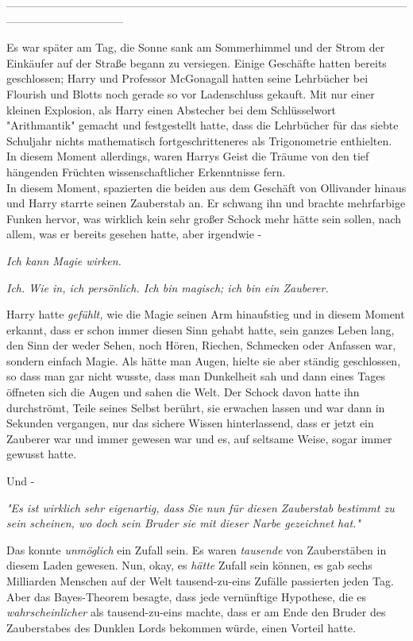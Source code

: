 {--------------------------------------------------------------------------------------------------------------------------------------------

Es war später am Tag, die Sonne sank am Sommerhimmel und der Strom der Einkäufer auf der Straße begann zu versiegen. Einige Geschäfte hatten bereits geschlossen; Harry und Professor McGonagall hatten seine Lehrbücher bei Flourish und Blotts noch gerade so vor Ladenschluss gekauft. Mit nur einer kleinen Explosion, als Harry einen Abstecher bei dem Schlüsselwort "Arithmantik" gemacht und festgestellt hatte, dass die Lehrbücher für das siebte Schuljahr nichts mathematisch fortgeschritteneres als Trigonometrie enthielten.\\ In diesem Moment allerdings, waren Harrys Geist die Träume von den tief hängenden Früchten wissenschaftlicher Erkenntnisse fern.\\ In diesem Moment, spazierten die beiden aus dem Geschäft von Ollivander hinaus und Harry starrte seinen Zauberstab an. Er schwang ihn und brachte mehrfarbige Funken hervor, was wirklich kein sehr großer Schock mehr hätte sein sollen, nach allem, was er bereits gesehen hatte, aber irgendwie -

\emph{Ich kann Magie wirken.}

\emph{Ich. Wie in, ich persönlich. Ich bin magisch; ich bin ein Zauberer.}

Harry hatte \emph{gefühlt,} wie die Magie seinen Arm hinaufstieg und in diesem Moment erkannt, dass er schon immer diesen Sinn gehabt hatte, sein ganzes Leben lang, den Sinn der weder Sehen, noch Hören, Riechen, Schmecken oder Anfassen war, sondern einfach Magie. Als hätte man Augen, hielte sie aber ständig geschlossen, so dass man gar nicht wusste, dass man Dunkelheit sah und dann eines Tages öffneten sich die Augen und sahen die Welt. Der Schock davon hatte ihn durchströmt, Teile seines Selbst berührt, sie erwachen lassen und war dann in Sekunden vergangen, nur das sichere Wissen hinterlassend, dass er jetzt ein Zauberer war und immer gewesen war und es, auf seltsame Weise, sogar immer gewusst hatte.

Und -

\emph{"Es ist wirklich sehr eigenartig, dass Sie nun für diesen Zauberstab bestimmt zu sein scheinen, wo doch sein Bruder sie mit dieser Narbe gezeichnet hat."}

Das konnte \emph{unmöglich} ein Zufall sein. Es waren \emph{tausende} von Zauberstäben in diesem Laden gewesen. Nun, okay, es \emph{hätte} Zufall sein können, es gab sechs Milliarden Menschen auf der Welt tausend-zu-eins Zufälle passierten jeden Tag. Aber das Bayes-Theorem besagte, dass jede vernünftige Hypothese, die es \emph{wahrscheinlicher} als tausend-zu-eins machte, dass er am Ende den Bruder des Zauberstabes des Dunklen Lords bekommen würde, einen Vorteil hatte.

}
